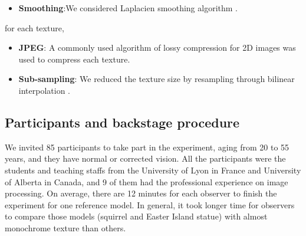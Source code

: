 \begin{itemize}
\item \textbf{Smoothing}:We considered Laplacien smoothing algorithm \cite{Steinbrecher_2008}.
\end{itemize}
for each texture,
\begin{itemize}
\item \textbf{JPEG}: A commonly used algorithm of lossy compression for 2D images was used to compress each texture.
\end{itemize}
\begin{itemize}
\item \textbf{Sub-sampling}: We reduced the texture size by resampling through bilinear interpolation .
\end{itemize}
\subsection{Participants and backstage procedure}
We invited 85 participants to take part in the experiment, aging from 20 to 55 years, and they have normal or corrected vision. All the participants were the students and teaching staffs from the University of Lyon in France and University of Alberta in Canada, and 9 of them had the professional experience on image processing. On average, there are 12 minutes for each observer to finish the experiment for one reference model.  In general, it took longer time for observers to compare those models (squirrel and Easter Island statue) with almost monochrome texture than others. 

